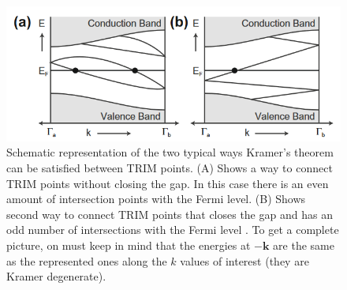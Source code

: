 \\[0.3cm]

\begin{figure}[t]
    \includegraphics[scale = 0.9]{sections/visuel/kramer.png}
    \caption{Schematic representation of the two typical ways Kramer's theorem can be satisfied between TRIM points. (A) Shows a way to connect TRIM points without closing the gap. In this case there is an even amount of intersection points with the Fermi level. (B) Shows second way to connect TRIM points that closes the gap and has an odd number of intersections with the Fermi level \cite{kane_topological_2013}. To get a complete picture, on must keep in mind that the energies at $-\mathbf{k}$ are the same as the represented ones along the $k$ values of interest (they are Kramer degenerate).}
    \label{TRIM}
\end{figure}

